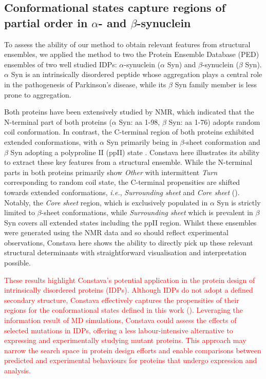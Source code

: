 \subsection[Conformational states capture regions of partial order in alpha- and beta-synuclein]{Conformational states capture regions of partial order in $\alpha$- and $\beta$-synuclein}

To assess the ability of our method to obtain relevant features from structural ensembles, we applied the method to two the Protein Ensemble Database (PED) ensembles of two well studied IDPs: $\alpha$-synuclein ($\alpha$ Syn) and $\beta$-synuclein ($\beta$ Syn). $\alpha$ Syn is an intrinsically disordered peptide whose aggregation plays a central role in the pathogenesis of Parkinson's disease, while its $\beta$ Syn family member is less prone to aggregation. 

Both proteins have been extensively studied by NMR, which indicated that the N-terminal part of both proteins ($\alpha$ Syn: aa 1-98, $\beta$ Syn: aa 1-76) adopts random coil conformation. In contrast, the C-terminal region of both proteins exhibited extended conformations, with $\alpha$ Syn primarily being in $\beta$-sheet conformation \cite{allison_relationship_2014} and $\beta$ Syn adopting a polyproline II (ppII) state \cite{bertoncini_structural_2007}. Constava here illustrates its ability to extract these key features from a structural ensemble. While the N-terminal parts in both proteins primarily show \textit{Other} with intermittent \textit{Turn} corresponding to random coil state, the C-terminal propensities are shifted towards extended conformations, \textit{i.e.}, \textit{Surrounding sheet} and \textit{Core sheet} (). Notably, the \textit{Core sheet} region, which is exclusively populated in $\alpha$ Syn is  strictly limited to $\beta$-sheet conformations, while \textit{Surrounding sheet} which is prevalent in $\beta$ Syn covers all extended states including the ppII region. Whilst these ensembles were generated using the NMR data and so should reflect experimental observations, Constava here shows the ability to directly pick up these relevant structural determinants with straightforward visualisation and interpretation possible.

\textcolor{red}{These results highlight Constava's potential application in the protein design of intrinsically disordered proteins (IDPs). Although IDPs do not adopt a defined secondary structure, Constava effectively captures the propensities of their regions for the conformational states defined in this work (). Leveraging the information result of MD simulations, Constava could assess the effects of selected mutations in IDPs, offering a less labour-intensive alternative to expressing and experimentally studying mutant proteins. This approach may narrow the search space in protein design efforts and enable comparisons between predicted and experimental behaviours for proteins that undergo expression and analysis.}

